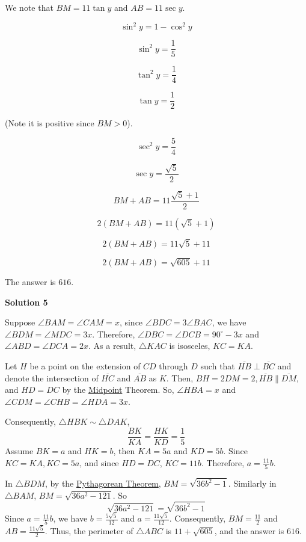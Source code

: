 \begin{enumerate}
 We note that $BM = 11\tan y$ and $AB = 11\sec y$.

 
 \[\sin ^2 y = 1 - \cos ^2 y\]

 \[\sin ^2 y = \frac{1}{5}\]

 \[\tan ^2 y = \frac{1}{4}\]

 \[\tan y = \frac{1}{2}\]

 (Note it is positive since $BM > 0$).

 
 \[\sec ^2 y = \frac{5}{4}\]

 \[\sec y = \frac{\sqrt{5}}{2}\]

 \[BM + AB = 11\frac{\sqrt{5}+1}{2}\]

 \[2(BM + AB) = 11(\sqrt{5} + 1)\]

 \[2(BM + AB) = 11\sqrt{5} + 11\]

 \[2(BM + AB) = \sqrt{605} + 11\]

 The answer is $\boxed{616}$.

 



\textbf{Solution 5}

Suppose $\angle BAM=\angle CAM =x$, since $\angle BDC=3\angle BAC$, we have $\angle BDM=\angle MDC = 3x$. Therefore, $\angle DBC=\angle DCB = 90^\circ -3x$ and $\angle ABD=\angle DCA=2x$. As a result, $\triangle KAC$ is isosceles, $KC=KA$.

 Let $H$ be a point on the extension of $CD$ through $D$ such that $\overline{HB}\perp\overline{BC}$ and denote the intersection of $\overline{HC}$ and $\overline{AB}$ as $K$. Then, $BH=2DM=2, \overline{HB}\parallel\overline{DM}$, and $HD=DC$ by the \href{https://artofproblemsolving.com/wiki/index.php?title=Midpoint}{Midpoint} Theorem. So, $\angle HBA=x$ and $\angle CDM=\angle CHB=\angle HDA= 3x$. 

 Consequently, $\triangle HBK\sim \triangle DAK$, 
 \[\frac{BK}{KA}=\frac{HK}{KD}=\frac{1}{5}\] Assume $BK=a$ and $HK=b$, then $KA=5a$ and $KD = 5b$. Since $KC=KA, KC=5a$, and since $HD=DC$, $KC=11b$. Therefore, $a=\frac{11}{5}b$.

 In $\triangle BDM$, by the \href{https://artofproblemsolving.com/wiki/index.php?title=Pythagorean\_Theorem}{Pythagorean Theorem}, $BM=\sqrt{36b^2-1}$. Similarly in $\triangle BAM$, $BM=\sqrt{36a^2-121}$. So 
 \[\sqrt{36a^2-121}=\sqrt{36b^2-1}\] Since $a=\frac{11}{5}b$, we have $b=\frac{5\sqrt{5}}{12}$ and $a=\frac{11\sqrt{5}}{12}$. Consequently, $BM=\frac{11}{2}$ and $AB=\frac{11\sqrt{5}}{2}$. Thus, the perimeter of $\triangle ABC$ is $11+\sqrt{605}$, and the answer is $\boxed{616}$.


\end{enumerate}
